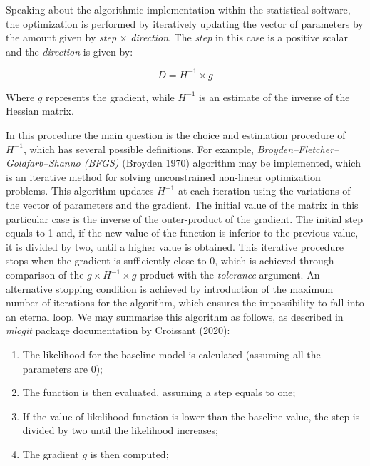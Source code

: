 \documentclass[12pt,]{article}
\providecommand{\tightlist}{%
  \setlength{\itemsep}{0pt}\setlength{\parskip}{0pt}}
\begin{document}
Speaking about the algorithmic implementation within the statistical
software, the optimization is performed by iteratively updating the
vector of parameters by the amount given by \emph{step} \(\times\)
\emph{direction}. The \emph{step} in this case is a positive scalar and
the \emph{direction} is given by:

\begin{equation}
D = H^{-1} \times g
\end{equation}

Where \(g\) represents the gradient, while \(H^{-1}\) is an estimate of
the inverse of the Hessian matrix.

In this procedure the main question is the choice and estimation
procedure of \(H^{-1}\), which has several possible definitions. For
example, \emph{Broyden--Fletcher--Goldfarb--Shanno (BFGS)} (Broyden
1970) algorithm may be implemented, which is an iterative method for
solving unconstrained non-linear optimization problems. This algorithm
updates \(H^{-1}\) at each iteration using the variations of the vector
of parameters and the gradient. The initial value of the matrix in this
particular case is the inverse of the outer-product of the gradient. The
initial step equals to 1 and, if the new value of the function is
inferior to the previous value, it is divided by two, until a higher
value is obtained. This iterative procedure stops when the gradient is
sufficiently close to 0, which is achieved through comparison of the
\(g \times H^{-1} \times g\) product with the \emph{tolerance} argument.
An alternative stopping condition is achieved by introduction of the
maximum number of iterations for the algorithm, which ensures the
impossibility to fall into an eternal loop. We may summarise this
algorithm as follows, as described in \emph{mlogit} package
documentation by Croissant (2020):

\begin{enumerate}
\def\labelenumi{\arabic{enumi}.}
\tightlist
\item
  The likelihood for the baseline model is calculated (assuming all the
  parameters are 0);
\item
  The function is then evaluated, assuming a step equals to one;
\item
  If the value of likelihood function is lower than the baseline value,
  the step is divided by two until the likelihood increases;
\item
  The gradient \(g\) is then computed;
\end{enumerate}
\end{document}
